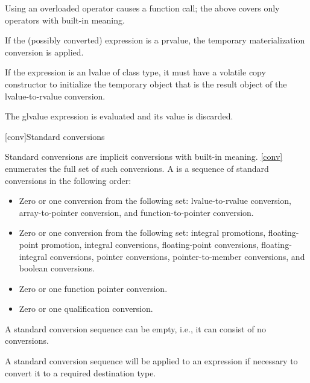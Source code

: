\begin{note}
Using an overloaded operator causes a function call; the
above covers only operators with built-in meaning.
\end{note}
If the (possibly converted) expression is a prvalue,
the temporary materialization conversion is applied.
\begin{note}
If the expression is an lvalue of
class type, it must have a volatile copy constructor to initialize the
temporary object that is the result object of the lvalue-to-rvalue
conversion.
\end{note}
The glvalue expression is evaluated and its value is discarded.

[conv]{Standard conversions}

%

\pnum
{}%
%
Standard conversions are implicit conversions with built-in meaning.
\ref{conv} enumerates the full set of such conversions. A
 is a sequence of standard
conversions in the following order:

\begin{itemize}
\item Zero or one conversion from the following set: lvalue-to-rvalue
conversion, array-to-pointer conversion, and function-to-pointer
conversion.

\item Zero or one conversion from the following set: integral
promotions, floating-point promotion, integral conversions, floating-point
conversions, floating-integral conversions, pointer conversions,
pointer-to-member conversions, and boolean conversions.

\item Zero or one function pointer conversion.

\item Zero or one qualification conversion.
\end{itemize}

\begin{note}
A standard conversion sequence can be empty, i.e., it can consist of no
conversions.
\end{note}
A standard conversion sequence will be applied to
an expression if necessary to convert it to a required destination type.

